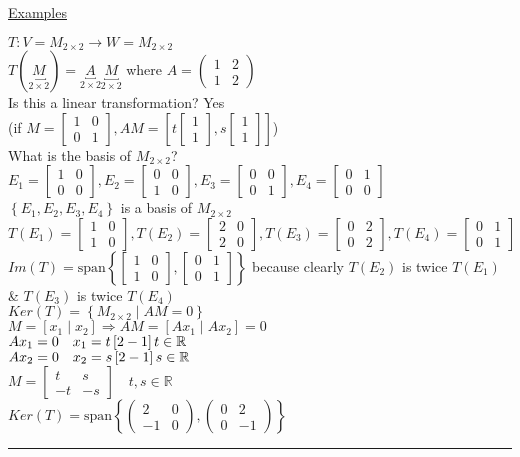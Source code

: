 \documentclass[12pt]{article}
\newcommand\m[1]{\begin{bmatrix}#1\end{bmatrix}}
\newcommand\mm[1]{\begin{pmatrix}#1\end{pmatrix}}
\newcommand{\real}[0]{\mathbb{R}}
\newcommand{\uu}[1]{\underbracket{#1}}
\newenvironment{examples}{\shownto{-,compact}\underline{Examples}\enumerate}{\endenumerate\divider\endshownto}
\newcommand{\bb}[1]{\left\{#1\right\}}
\newcommand{\bbb}[1]{\left[#1\right]}
\newcommand{\divider}[0]{\par\textcolor{lightgray}{\rule{\textwidth}{0.1pt}}}
\newcommand{\sspan}[1]{\text{span}\bb{#1}}
\begin{document}
\begin{examples}
		\item $T: V = M_{2 \times 2} \rightarrow W = M_{2 \times 2}$ \\
		$T(\uu{M}_{2 \times 2}) = \uu{A}_{2 \times 2} \uu{M}_{2 \times 2}$ \quad where $A = \mm{1 & 2 \\ 1 & 2}$ \\
		Is this a linear transformation? Yes \\
		(if $M = \m{1 & 0 \\ 0 & 1}, AM = \bbb{t\m{1 \\ 1}, s\m{1 \\ 1}}$) \\
		What is the basis of $M_{2 \times 2}$? \quad $E_1 = \m{1 & 0 \\ 0 & 0}, E_2 = \m{0 & 0 \\ 1 & 0}, E_3 = \m{0 & 0 \\ 0 & 1}, E_4 = \m{0 & 1 \\ 0 & 0}$ \\
		$\bb{E_1, E_2, E_3, E_4}$ is a basis of $M_{2 \times 2}$ \\
		$T(E_1) = \m{1 & 0 \\ 1 & 0}, T(E_2) = \m{2 & 0 \\ 2 & 0}, T(E_3) = \m{0 & 2 \\ 0 & 2}, T(E_4) = \m{0 & 1 \\ 0 & 1}$ \\
		$Im(T) = \sspan{\m{1 & 0 \\ 1 & 0}, \m{0 & 1 \\ 0 & 1}}$ because clearly $T(E_2)$ is twice $T(E_1)$ \& $T(E_3)$ is twice $T(E_4)$ \\
		
		$Ker(T) = \bb{M_{2 \times 2} \mid AM = 0}$ \\
		$M = \bbb{x_1 \mid x_2} \Rightarrow AM = \bbb{Ax_1 \mid Ax_2} = 0$ \\
		$Ax_1 = 0 \quad x_1 = t \bbb{2 \\ -1} t \in \real$ \\
		$Ax_2 = 0 \quad x_2 = s \bbb{2 \\ -1} s \in \real$ \\
		
		$M = \m{t & s \\ -t & -s} \quad t, s \in \real$ \\
		
		$Ker(T) = \sspan{\mm{2 & 0 \\ -1 & 0}, \mm{0 & 2 \\ 0 & -1}}$
		
	\end{examples}
	
\end{document}
